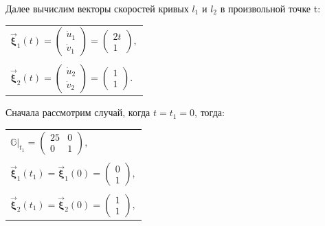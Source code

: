 \documentclass[12pt,a4paper]{article}
\newcommand{\boldVec}[1]{\vec{\mathbf #1}}
\begin{document}
    Далее вычислим векторы скоростей кривых $ l_1 $ и $ l_2 $ в произвольной точке t:
    \begin{table}[h]
        \centering
        \begin{tabular}{l}
            $ \boldVec \xi_1(t)  = 
                \begin{pmatrix}
                    \dot u_1
                    \\
                    \dot v_1
                \end{pmatrix}
            =
                \begin{pmatrix}
                    2t
                    \\
                    1
                \end{pmatrix}\! ,
            $ 
            \\ \\
            $ \boldVec \xi_2(t)  = 
                \begin{pmatrix}
                    \dot u_2
                    \\
                    \dot v_2
                \end{pmatrix}
            =
                \begin{pmatrix}
                    1
                    \\
                    1
                \end{pmatrix}\! .
            $ 
        \end{tabular}
    \end{table}

    \pagebreak
    
    Сначала рассмотрим случай, когда $t = t_1 = 0$, тогда:
    \begin{table}[h]
        \centering
        \begin{tabular}{l}
            $ \mathbb{G}|_{t_1} = 
                \begin{pmatrix}
                    25 & 0
                    \\
                    0  & 1
                \end{pmatrix}\! ,
            $
            \\ \\
            $ \boldVec \xi_1(t_1) = \boldVec \xi_1(0) = 
                \begin{pmatrix}
                    0
                    \\
                    1
                \end{pmatrix}\! ,
            $ 
            \\ \\
            $ \boldVec \xi_2(t_1) = \boldVec \xi_2(0) = 
                \begin{pmatrix}
                    1
                    \\
                    1
                \end{pmatrix}\! ,
            $ 
        \end{tabular}
    \end{table}
\end{document}
